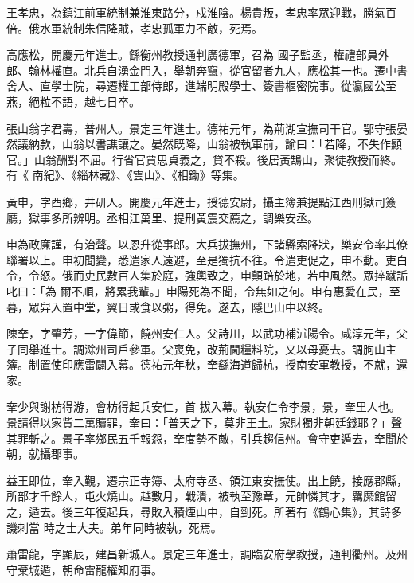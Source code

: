 \begin{pinyinscope}
 王孝忠，為鎮江前軍統制兼淮東路分，戍淮陰。楊貴叛，孝忠率眾迎戰，勝氣百倍。俄水軍統制朱信降賊，孝忠孤軍力不敵，死焉。



 高應松，開慶元年進士。繇衡州教授通判廣德軍，召為
 國子監丞，權禮部員外郎、翰林權直。北兵自湧金門入，舉朝奔竄，從官留者九人，應松其一也。遷中書舍人、直學士院，尋遷權工部侍郎，進端明殿學士、簽書樞密院事。從瀛國公至燕，絕粒不語，越七日卒。



 張山翁字君壽，普州人。景定三年進士。德祐元年，為荊湖宣撫司干官。鄂守張晏然議納款，山翁以書譙讓之。晏然既降，山翁被執軍前，諭曰：「若降，不失作顯官。」山翁酬對不屈。行省官賈思貞義之，貸不殺。後居黃鵠山，聚徒教授而終。有《
 南紀》、《緇林藏》、《雲山》、《相鋤》等集。



 黃申，字酉鄉，井研人。開慶元年進士，授德安尉，攝主簿兼提點江西刑獄司簽廳，獄事多所辨明。丞相江萬里、提刑黃震交薦之，調樂安丞。



 申為政廉謹，有治聲。以恩升從事郎。大兵拔撫州，下諸縣索降狀，樂安令率其僚聯署以上。申初聞變，悉遣家人遠避，至是獨抗不往。令遣吏促之，申不動。吏白令，令怒。俄而吏民數百人集於庭，強輿致之，申顛踣於地，若中風然。眾捽蹴詬叱曰：「為
 爾不順，將累我輩。」申陽死為不聞，令無如之何。申有惠愛在民，至暮，眾舁入置中堂，翼日或食以粥，得免。遂去，隱巴山中以終。



 陳羍，字肇芳，一字偉節，饒州安仁人。父詩川，以武功補沭陽令。咸淳元年，父子同舉進士。調滁州司戶參軍。父喪免，改荊閫糧料院，又以母憂去。調朐山主簿。制置使印應雷闢入幕。德祐元年秋，羍繇海道歸杭，授南安軍教授，不就，還家。



 羍少與謝枋得游，會枋得起兵安仁，首
 拔入幕。執安仁令李景，景，羍里人也。景請得以家貲二萬贖罪，羍曰：「普天之下，莫非王土。家財獨非朝廷錢耶？」聲其罪斬之。景子率鄉民五千報怨，羍度勢不敵，引兵趨信州。會守吏遁去，羍聞於朝，就攝郡事。



 益王即位，羍入覲，遷宗正寺簿、太府寺丞、領江東安撫使。出上饒，接應郡縣，所部才千餘人，屯火燒山。越數月，戰潰，被執至豫章，元帥憐其才，羈縻館留之，遁去。後三年復起兵，尋敗入積煙山中，自剄死。所著有《鶴心集》，其詩多譏刺當
 時之士大夫。弟年同時被執，死焉。



 蕭雷龍，字顯辰，建昌新城人。景定三年進士，調臨安府學教授，通判衢州。及州守棄城遁，朝命雷龍權知府事。




\end{pinyinscope}
